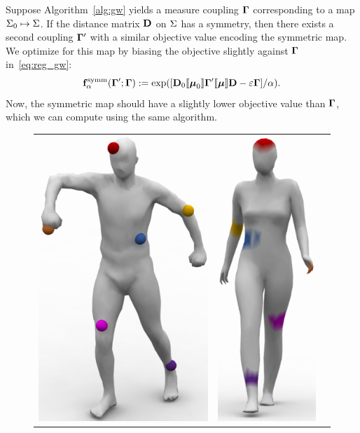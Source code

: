 Suppose Algorithm~\ref{alg:gw} yields a measure coupling $\mathbf \Gamma$ corresponding to a map $\Sigma_0\mapsto\Sigma$.  If the distance matrix $\mathbf D$ on $\Sigma$ has a symmetry, then there exists a second coupling $\mathbf \Gamma'$ with a similar \GWa objective value encoding the symmetric map.  We optimize for this map by biasing the \GWa objective slightly against $\mathbf \Gamma$ in~\eqref{eq:reg_gw}:%
\begin{equation}\label{eq:symm_objective}
\mathbf{f}^{\mathrm{symm}}_\alpha(\mathbf \Gamma';\mathbf \Gamma):=\exp([\mathbf D_0[\![\boldsymbol{\mu}_0]\!]\mathbf \Gamma'[\![\boldsymbol{\mu}]\!]\mathbf D-\varepsilon \mathbf \Gamma]/\alpha).
\end{equation}
Now, the symmetric map should have a slightly lower objective value than $\mathbf \Gamma$, which we can compute using the same algorithm.

\setlength{\columnsep}{2pt}
\begin{figure}\centering
\vspace{-.2in}
\begin{tabular}{c@{}c@{}c}
\includegraphics[height=.6\linewidth]{figures/symmetry/source_human.pdf}&
\includegraphics[height=.6\linewidth]{figures/symmetry/target_symmetric_humans_orig_cropped.pdf}&

\end{tabular}
\end{figure}

